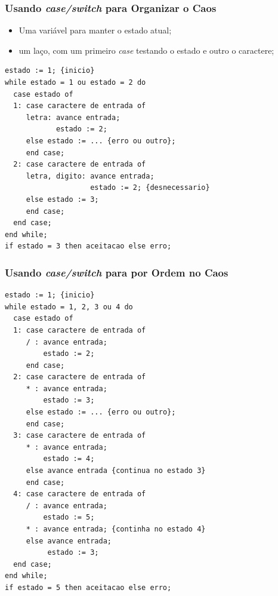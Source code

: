 \documentclass[table]{beamer}
\begin{document}
\begin{frame}[fragile]
   \frametitle{Usando \textit{case/switch} para Organizar o Caos}
   \begin{itemize}
      \item Uma variável para manter o estado atual;
      \item um laço, com um primeiro \textit{case} testando o estado e outro o caractere;
   \end{itemize}
   \footnotesize
   \begin{verbatim}
estado := 1; {inicio}
while estado = 1 ou estado = 2 do
  case estado of
  1: case caractere de entrada of
     letra: avance entrada;
            estado := 2;
     else estado := ... {erro ou outro};
     end case;
  2: case caractere de entrada of
     letra, digito: avance entrada;
                    estado := 2; {desnecessario}
     else estado := 3;
     end case;
  end case;
end while;
if estado = 3 then aceitacao else erro;
   \end{verbatim}
\end{frame}

\begin{frame}[fragile]
   \frametitle{Usando \textit{case/switch} para por Ordem no Caos}
   \scriptsize
   \begin{verbatim}
estado := 1; {inicio}
while estado = 1, 2, 3 ou 4 do
  case estado of
  1: case caractere de entrada of
     / : avance entrada;
         estado := 2;
     end case;
  2: case caractere de entrada of
     * : avance entrada;
         estado := 3;
     else estado := ... {erro ou outro};
     end case;
  3: case caractere de entrada of
     * : avance entrada;
         estado := 4;
     else avance entrada {continua no estado 3}
     end case;
  4: case caractere de entrada of
     / : avance entrada;
         estado := 5;
     * : avance entrada; {continha no estado 4}
     else avance entrada;
          estado := 3;
  end case;
end while;
if estado = 5 then aceitacao else erro;
   \end{verbatim}
\end{frame}
\end{document}
